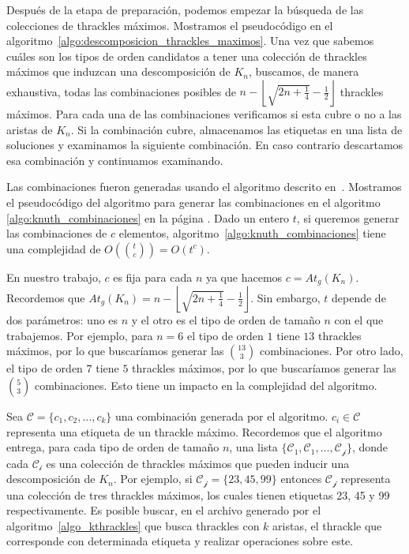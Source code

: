  Después de la etapa de preparación, podemos empezar la búsqueda de las colecciones de
  thrackles máximos. Mostramos el pseudocódigo en el
  algoritmo~\ref{algo:descomposicion_thrackles_maximos}. Una vez que sabemos cuáles son
  los tipos de orden candidatos a tener una colección de thrackles máximos que induzcan
  una descomposición de $K_n$, buscamos, de manera exhaustiva, todas las combinaciones
  posibles de $n -  \left\lfloor\sqrt{2n + \frac{1}{4}} - \frac{1}{2}\right\rfloor$
  thrackles máximos. Para cada una de las combinaciones verificamos si esta cubre o no a
  las aristas de $K_n$. Si la combinación cubre, almacenamos las etiquetas en una lista
  de soluciones y examinamos la siguiente combinación. En caso contrario descartamos esa
  combinación y continuamos examinando.

  Las combinaciones fueron generadas usando el algoritmo descrito en~\cite{Knuth2011A}.
  Mostramos el pseudocódigo del algoritmo para generar las combinaciones en el algoritmo
  \ref{algo:knuth_combinaciones} en la página \pageref{algo:knuth_combinaciones}. Dado un
  entero $t$, si queremos generar las combinaciones de $c$ elementos,
  algoritmo~\ref{algo:knuth_combinaciones} tiene una complejidad de
  $O\left(\binom{t}{c}\right) = O(t^c)$.

  En nuestro trabajo, $c$ es fija para cada $n$ ya que hacemos $c = At_g(K_n)$.
  Recordemos que $At_g(K_n) = n - \left\lfloor\sqrt{2n+\frac{1}{4}} -
  \frac{1}{2}\right\rfloor$. Sin embargo, $t$ depende de dos parámetros: uno es $n$ y el
  otro es el tipo de orden de tamaño $n$ con el que trabajemos. Por ejemplo, para $n=6$
  el tipo de orden $1$ tiene $13$ thrackles máximos, por lo que buscaríamos generar las
  $\binom{13}{3}$ combinaciones. Por otro lado, el tipo de orden $7$ tiene $5$ thrackles
  máximos, por lo que buscaríamos generar las $\binom{5}{3}$ combinaciones. Esto tiene un
  impacto en la complejidad del algoritmo.

  Sea $\mathcal{C}=\{c_1,c_2,\dots,c_k\}$ una combinación generada por el algoritmo.
  $c_i\in\mathcal{C}$ representa una etiqueta de un thrackle máximo. Recordemos que el
  algoritmo entrega, para cada tipo de orden de tamaño $n$, una lista
  $\{\mathcal{C_1},\mathcal{C_1},\dots,\mathcal{C_j}\}$, donde cada $\mathcal{C_i}$ es
  una colección de thrackles máximos que pueden inducir una descomposición de $K_n$. Por
  ejemplo, si $\mathcal{C_j}=\{23,45,99\}$ entonces $\mathcal{C_j}$ representa una
  colección de tres thrackles máximos, los cuales tienen etiquetas 23, 45 y 99
  respectivamente. Es posible buscar, en el archivo generado por el
  algoritmo~\ref{algo_kthrackles} que busca thrackles con $k$ aristas, el thrackle que
  corresponde con determinada etiqueta y realizar operaciones sobre este.

